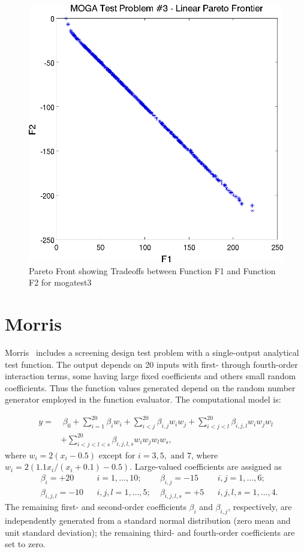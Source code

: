 \begin{figure}
  \centering
  \includegraphics[scale=0.75]{images/dakota_mogatest3_pareto_front}
  \caption{Pareto Front showing Tradeoffs between Function F1 and
    Function F2 for mogatest3}
  \label{additional:moga3front}
\end{figure}

\clearpage
\section{Morris}\label{additional:morris}

Morris~\cite{Mor91} includes a screening design test problem with a
single-output analytical test function. The output depends on 20
inputs with first- through fourth-order interaction terms, some having
large fixed coefficients and others small random coefficients. Thus
the function values generated depend on the random number generator
employed in the function evaluator. The computational model is:

\begin{align*}
y = &\;\beta_0 + \sum_{i=1}^{20}{\beta_i w_i} + \sum_{i<j}^{20}{\beta_{i,j} w_i w_j} + \sum_{i<j<l}^{20}{\beta_{i,j,l} w_i w_j w_l} \\
    &+  \sum_{i<j<l<s}^{20}{\beta_{i,j,l,s} w_i w_j w_l w_s},
\end{align*}
where $w_i = 2(x_i-0.5)$ except for $i=3, 5, \mbox{ and } 7$, where $w_i=2(1.1x_i/(x_i+0.1) - 0.5)$. Large-valued coefficients are assigned as
\begin{align*}
&\beta_i = +20 & &i=1,\ldots,10; \;&\beta_{i,j} = -15& &i,j = 1, \ldots, 6; \\
&\beta_{i,j,l} = -10& &i,j,l=1,\ldots,5; \;&\beta_{i,j,l,s} = +5& &i,j,l,s = 1, \ldots, 4.
\end{align*}
The remaining first- and second-order coefficients $\beta_i$ and
$\beta_{i,j}$, respectively, are independently generated from a
standard normal distribution (zero mean and unit standard deviation);
the remaining third- and fourth-order coefficients are set to zero.

